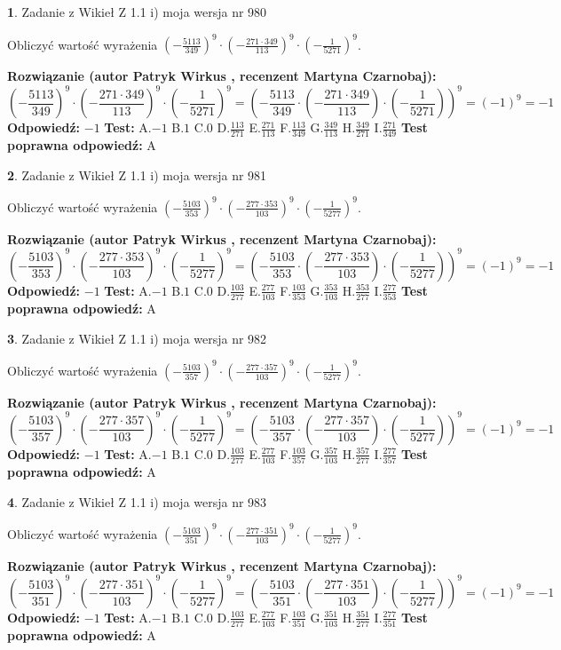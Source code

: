 \documentclass[12pt, a4paper]{article}
\theoremstyle{definition} %
\newtheorem{zad}{}
\newcommand{\zadStart}[1]{\begin{zad}#1\newline}
\newcommand{\zadStop}{\end{zad}}
\newcommand{\rozwStart}[2]{\noindent \textbf{Rozwiązanie (autor #1 , recenzent #2): }\newline}
\newcommand{\rozwStop}{\newline}
\newcommand{\odpStart}{\noindent \textbf{Odpowiedź:}\newline}
\newcommand{\odpStop}{\newline}
\newcommand{\testStart}{\noindent \textbf{Test:}\newline}
\newcommand{\testStop}{\newline}
\newcommand{\kluczStart}{\noindent \textbf{Test poprawna odpowiedź:}\newline}
\newcommand{\kluczStop}{\newline}
\begin{document}
\zadStart{Zadanie z Wikieł Z 1.1 i) moja wersja nr 980}

Obliczyć wartość wyrażenia $(-\frac{5113}{349})^{9} \cdot (-\frac{271 \cdot 349}{113})^{9} \cdot (-\frac{1}{5271})^{9}$.
\zadStop
\rozwStart{Patryk Wirkus}{Martyna Czarnobaj}
$$(-\frac{5113}{349})^{9} \cdot (-\frac{271 \cdot 349}{113})^{9} \cdot (-\frac{1}{5271})^{9} = (-\frac{5113}{349} \cdot (-\frac{271 \cdot 349}{113}) \cdot (-\frac{1}{5271}))^{9} = (-1)^{9} = -1$$
\rozwStop
\odpStart
$-1$
\odpStop
\testStart
A.$-1$ B.$1$ C.$0$ D.$\frac{113}{271}$ E.$\frac{271}{113}$
F.$\frac{113}{349}$ G.$\frac{349}{113}$
H.$\frac{349}{271}$
I.$\frac{271}{349}$
\testStop
\kluczStart
A
\kluczStop



\zadStart{Zadanie z Wikieł Z 1.1 i) moja wersja nr 981}

Obliczyć wartość wyrażenia $(-\frac{5103}{353})^{9} \cdot (-\frac{277 \cdot 353}{103})^{9} \cdot (-\frac{1}{5277})^{9}$.
\zadStop
\rozwStart{Patryk Wirkus}{Martyna Czarnobaj}
$$(-\frac{5103}{353})^{9} \cdot (-\frac{277 \cdot 353}{103})^{9} \cdot (-\frac{1}{5277})^{9} = (-\frac{5103}{353} \cdot (-\frac{277 \cdot 353}{103}) \cdot (-\frac{1}{5277}))^{9} = (-1)^{9} = -1$$
\rozwStop
\odpStart
$-1$
\odpStop
\testStart
A.$-1$ B.$1$ C.$0$ D.$\frac{103}{277}$ E.$\frac{277}{103}$
F.$\frac{103}{353}$ G.$\frac{353}{103}$
H.$\frac{353}{277}$
I.$\frac{277}{353}$
\testStop
\kluczStart
A
\kluczStop



\zadStart{Zadanie z Wikieł Z 1.1 i) moja wersja nr 982}

Obliczyć wartość wyrażenia $(-\frac{5103}{357})^{9} \cdot (-\frac{277 \cdot 357}{103})^{9} \cdot (-\frac{1}{5277})^{9}$.
\zadStop
\rozwStart{Patryk Wirkus}{Martyna Czarnobaj}
$$(-\frac{5103}{357})^{9} \cdot (-\frac{277 \cdot 357}{103})^{9} \cdot (-\frac{1}{5277})^{9} = (-\frac{5103}{357} \cdot (-\frac{277 \cdot 357}{103}) \cdot (-\frac{1}{5277}))^{9} = (-1)^{9} = -1$$
\rozwStop
\odpStart
$-1$
\odpStop
\testStart
A.$-1$ B.$1$ C.$0$ D.$\frac{103}{277}$ E.$\frac{277}{103}$
F.$\frac{103}{357}$ G.$\frac{357}{103}$
H.$\frac{357}{277}$
I.$\frac{277}{357}$
\testStop
\kluczStart
A
\kluczStop



\zadStart{Zadanie z Wikieł Z 1.1 i) moja wersja nr 983}

Obliczyć wartość wyrażenia $(-\frac{5103}{351})^{9} \cdot (-\frac{277 \cdot 351}{103})^{9} \cdot (-\frac{1}{5277})^{9}$.
\zadStop
\rozwStart{Patryk Wirkus}{Martyna Czarnobaj}
$$(-\frac{5103}{351})^{9} \cdot (-\frac{277 \cdot 351}{103})^{9} \cdot (-\frac{1}{5277})^{9} = (-\frac{5103}{351} \cdot (-\frac{277 \cdot 351}{103}) \cdot (-\frac{1}{5277}))^{9} = (-1)^{9} = -1$$
\rozwStop
\odpStart
$-1$
\odpStop
\testStart
A.$-1$ B.$1$ C.$0$ D.$\frac{103}{277}$ E.$\frac{277}{103}$
F.$\frac{103}{351}$ G.$\frac{351}{103}$
H.$\frac{351}{277}$
I.$\frac{277}{351}$
\testStop
\kluczStart
A
\kluczStop
\end{document}
